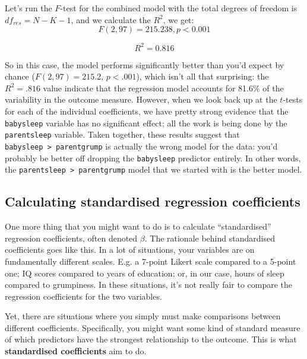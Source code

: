 \documentclass[
  11pt,
  a4paper,
  twoside,symmetric,openright]{book}
\theoremstyle{break}
\theoremstyle{break}
\begin{document}
Let's run the \(F\)-test for the combined model with the total degrees of freedom is \(df_{res} = N - K - 1\), and we calculate the \(R^2\), we get:
\[
F(2, 97) = 215.238, p < 0.001
\]

\[
R^2 = 0.816
\]

So in this case, the model performs significantly better than you'd expect by chance (\(F(2,97) = 215.2\), \(p<.001\)), which isn't all that surprising: the \(R^2 = .816\) value indicate that the regression model accounts for 81.6\% of the variability in the outcome measure. However, when we look back up at the \(t\)-tests for each of the individual coefficients, we have pretty strong evidence that the \texttt{babysleep} variable has no significant effect; all the work is being done by the \texttt{parentsleep} variable. Taken together, these results suggest that \texttt{babysleep\ \textgreater{}\ parentgrump} is actually the wrong model for the data: you'd probably be better off dropping the \texttt{babysleep} predictor entirely. In other words, the \texttt{parentsleep\ \textgreater{}\ parentgrump} model that we started with is the better model.

\subsection{Calculating standardised regression coefficients}\label{stdcoef}

One more thing that you might want to do is to calculate ``standardised'' regression coefficients, often denoted \(\beta\). The rationale behind standardised coefficients goes like this. In a lot of situations, your variables are on fundamentally different scales. E.g. a 7-point Likert scale compared to a 5-point one; IQ scores compared to years of education; or, in our case, hours of sleep compared to grumpiness. In these situations, it's not really fair to compare the regression coefficients for the two variables.

Yet, there are situations where you simply must make comparisons between different coefficients. Specifically, you might want some kind of standard measure of which predictors have the strongest relationship to the outcome. This is what \textbf{standardised coefficients} aim to do.
\end{document}
